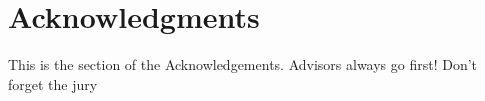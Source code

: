 \documentclass[../Main_PhD_Dissertation.tex]{subfiles}
\begin{document}
	\chapter*{Acknowledgments}
	
This is the section of the Acknowledgements. Advisors always go first! Don't forget the jury
	
	
\end{document}
